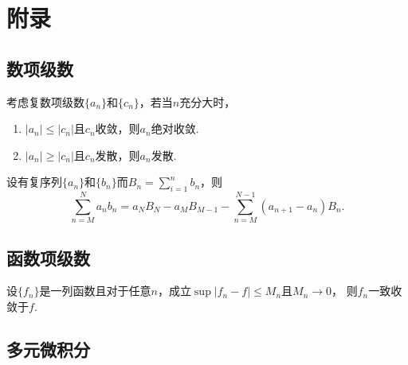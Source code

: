 


\newpage
\section{附录}

\subsection{数项级数}

  \begin{thm}
    考虑复数项级数$\{a_n\}$和$\{c_n\}$，若当$n$充分大时，
    \begin{enumerate}
      \item $|a_n| \le |c_n|$且$c_n$收敛，则$a_n$绝对收敛.
      \item $|a_n| \ge |c_n|$且$c_n$发散，则$a_n$发散.
    \end{enumerate}
  \end{thm}

  \begin{thm}[分部求和]
    \label{thm: 分部求和}
    设有复序列$\{a_n\}$和$\{b_n\}$而$B_n=\sum_{i=1}^nb_n$，则
    \[
      \sum_{n=M}^N a_nb_n = a_NB_N - a_MB_{M-1} -
      \sum_{n=M}^{N-1}(a_{n+1}-a_n)B_n.
    \]
  \end{thm}

\subsection{函数项级数}

  \begin{thm}
    设$\{f_n\}$是一列函数且对于任意$n$，成立$\sup|f_n-f|\le M_n$且$M_n\to 0$，
    则$f_n$一致收敛于$f$.
  \end{thm}

\subsection{多元微积分}

